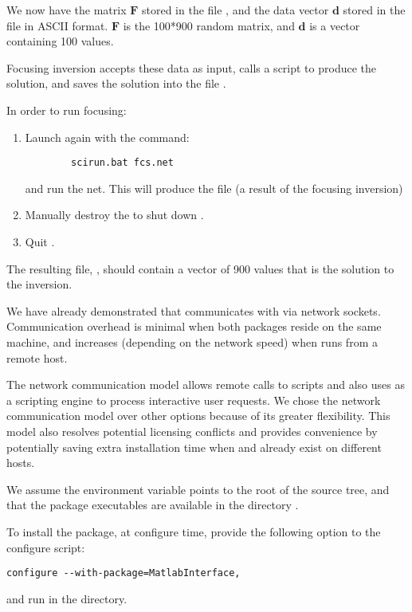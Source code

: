 We now have the matrix $\mathbf{F}$ stored in the file ,
and the data vector $\mathbf{d}$ stored in the file 
in ASCII format.  $\mathbf{F}$ is the 100*900 random matrix, and
$\mathbf{d}$ is a vector containing 100 values.

Focusing inversion accepts these data as input, calls a \m{} script
 to produce the solution, and saves the solution into the
file .

In order to run focusing:
%
\begin{enumerate}
  \item Launch \sr{} again with the command:
        \begin{verbatim}
        scirun.bat fcs.net
        \end{verbatim}
        and run the net. This will produce the file 
        (a result of the focusing inversion)
  \item Manually destroy the \mlm{} to shut down \m{}. 
  \item Quit \sr{}.
\end{enumerate}

The resulting file, , should contain a vector of
900 values that is the solution to the inversion.

\ModuleRefDetails

We have already demonstrated that \sr{} communicates with \m{} via network
sockets.  Communication overhead is minimal when both packages reside on
the same machine, and increases (depending on the network speed) when \m{}
runs from a remote host.

The network communication model allows remote calls to \m{} scripts and
also uses \m{} as a scripting engine to process interactive user
requests. We chose the network communication model over other options
because of its greater flexibility. This model also resolves potential
licensing conflicts and provides convenience by potentially saving extra
installation time when \sr{} and \m{} already exist on different hosts.


\ModuleRefNotes


We assume the environment variable  points to the root of
the \sr{} source tree, and that the package executables are available in
the directory .

To install the \mlm{} package, at configure time, provide the following
option to the configure script:
%
\begin{verbatim}
configure --with-package=MatlabInterface,
\end{verbatim}
%
and run  in the  directory.


